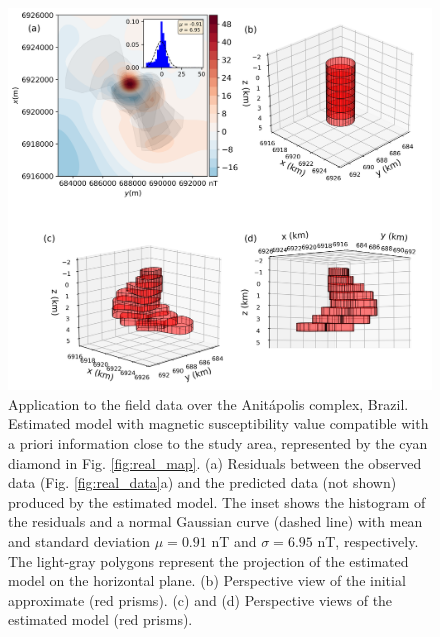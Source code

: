 \begin{figure}
    \centering
    \includegraphics[scale=.5]{figures/real_results_cyan_diamond.png}
    \caption{Application to the field data over the Anit{\'a}polis complex, Brazil.
    Estimated model with magnetic susceptibility value compatible with 
    a priori information close to the study area, 
    represented by the cyan diamond in Fig. \ref{fig:real_map}. 
    (a) Residuals between the observed data (Fig. \ref{fig:real_data}a) and the 
    predicted data (not shown) produced by the estimated model. 
    The inset shows the histogram of the residuals and a normal 
    Gaussian curve (dashed line) with mean and standard deviation 
    $\mu = 0.91$ nT and $\sigma = 6.95$ nT, respectively.
    The light-gray polygons represent the projection of the estimated 
    model on the horizontal plane. 
    (b) Perspective view of the initial approximate (red prisms). 
    (c) and (d) Perspective views of the estimated model (red prisms).}
    \label{fig:real_result}
\end{figure}